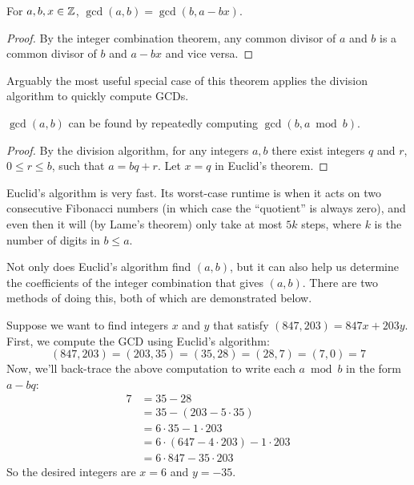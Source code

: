 \documentclass[../m055main.tex]{subfiles}
\begin{document}
\begin{theorem}
    For $a,b,x \in \mathbb{Z}$, $\gcd (a,b) = \gcd (b, a - bx)$.
\end{theorem}

\begin{proof}
    By the integer combination theorem, any common divisor of $a$ and $b$ is a common divisor of $b$ and $a - bx$ and vice versa.
\end{proof}

Arguably the most useful special case of this theorem applies the division algorithm to quickly compute GCDs.

\begin{corollary}
    $\gcd (a,b)$ can be found by repeatedly computing $\gcd (b, a \bmod b)$.
\end{corollary}

\begin{proof}
    By the division algorithm, for any integers $a,b$ there exist integers $q$ and $r$, $0 \leq r \leq b$, such that $a = bq + r$.
    Let $x = q$ in Euclid's theorem.
\end{proof}

Euclid's algorithm is very fast.
Its worst-case runtime is when it acts on two consecutive Fibonacci numbers (in which case the ``quotient'' is always zero), and even then it will (by Lame's theorem) only take at most $5k$ steps, where $k$ is the number of digits in $b \leq a$.

Not only does Euclid's algorithm find $(a,b)$, but it can also help us determine the coefficients of the integer combination that gives $(a,b)$.
There are two methods of doing this, both of which are demonstrated below.

\begin{example}
    Suppose we want to find integers $x$ and $y$ that satisfy $(847, 203) = 847x + 203y$.
    First, we compute the GCD using Euclid's algorithm:
    \[ (847,203) = (203,35) = (35,28) = (28,7) = (7,0) = 7 \]
    Now, we'll back-trace the above computation to write each $a \bmod b$ in the form $a - bq$:
    \begin{align*}
        7 &= 35 - 28 \\
        &= 35 - (203 - 5 \cdot 35) \\
        &= 6 \cdot 35 - 1 \cdot 203 \\
        &= 6 \cdot (647 - 4 \cdot 203) - 1 \cdot 203 \\
        &= 6 \cdot 847 - 35 \cdot 203
    \end{align*}
    So the desired integers are $x = 6$ and $y = -35$.
\end{example}
\end{document}
